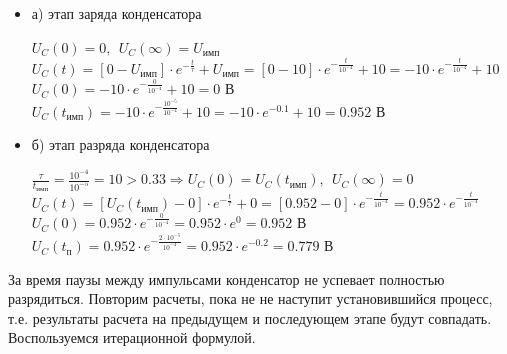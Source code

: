 \documentclass[a4paper,14pt]{extarticle}
\begin{document}
\begin{itemize}
	\item[] а) этап заряда конденсатора

	$U_C(0) = 0,\ \ U_C(\infty) = U_\text{имп}$\\	
	$U_C(t) = [0 - U_\text{имп}] \cdot e^{-\frac{t}{\tau}} + U_\text{имп} = [0 - 10] \cdot e^{-\frac{t}{10^{-4}}} + 10 = -10 \cdot e^{-\frac{t}{10^{-4}}} + 10$\\
	$U_C(0) = -10 \cdot e^{-\frac{0}{10^{-4}}} + 10 = 0 \text{ В}$\\
	$U_C(t_\text{имп}) = -10 \cdot e^{-\frac{10^{-5}}{10^{-4}}} + 10 = -10 \cdot e^{-0.1} + 10 = 0.952 \text{ В}$
	
	\item[] б) этап разряда конденсатора

	$\frac{\tau}{t_\text{имп}} = \frac{10^{-4}}{10^{-5}} = 10 > 0.33 \Rightarrow U_C(0) = U_C(t_\text{имп}),\ \ U_C(\infty) = 0$\\
	$U_C(t) = [U_C(t_\text{имп}) - 0] \cdot e^{-\frac{t}{\tau}} + 0 =  [0.952 - 0] \cdot e^{-\frac{t}{10^{-4}}} = 0.952 \cdot e^{-\frac{t}{10^{-4}}}$\\
	$U_C(0) = 0.952 \cdot e^{-\frac{0}{10^{-4}}} = 0.952 \cdot e^0 = 0.952 \text{ В}$\\
	$U_C(t_\text{п}) = 0.952 \cdot e^{-\frac{ 2 \cdot 10^{-5}}{10^{-4}}} = 0.952 \cdot e^{-0.2} = 0.779 \text{ В}$
\end{itemize}				
		
За время паузы между импульсами конденсатор не успевает полностью разрядиться. Повторим расчеты, пока не не наступит установившийся процесс, т.е. результаты расчета на предыдущем и последующем этапе будут совпадать.	Воспользуемся итерационной формулой.
\end{document}
